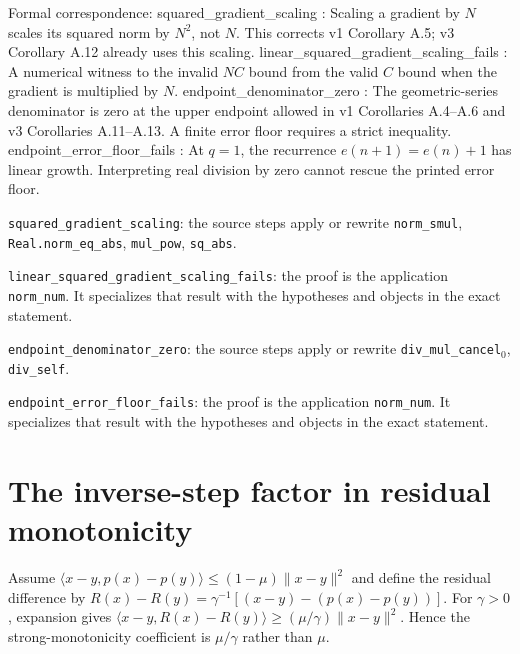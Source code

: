 \documentclass[11pt,a4paper]{article}
\begin{document}
\begin{leanbox}
Formal correspondence: squared\_gradient\_scaling : Scaling a gradient by \(N\) scales its squared norm by \(N^2\), not \(N\). This corrects v1 Corollary A.5; v3 Corollary A.12 already uses this scaling. linear\_squared\_gradient\_scaling\_fails : A numerical witness to the invalid \(NC\) bound from the valid \(C\) bound when the gradient is multiplied by \(N\). endpoint\_denominator\_zero : The geometric-series denominator is zero at the upper endpoint allowed in v1 Corollaries A.4--A.6 and v3 Corollaries A.11--A.13. A finite error floor requires a strict inequality. endpoint\_error\_floor\_fails : At \(q=1\), the recurrence \(e(n+1)=e(n)+1\) has linear growth. Interpreting real division by zero cannot rescue the printed error floor.



\texttt{squared\_\allowbreak{}gradient\_\allowbreak{}scaling}: the source steps apply or rewrite \texttt{norm\_\allowbreak{}smul}, \texttt{Real.\allowbreak{}norm\_\allowbreak{}eq\_\allowbreak{}abs}, \texttt{mul\_\allowbreak{}pow}, \texttt{sq\_\allowbreak{}abs}.



\texttt{linear\_\allowbreak{}squared\_\allowbreak{}gradient\_\allowbreak{}scaling\_\allowbreak{}fails}: the proof is the application \texttt{norm\_\allowbreak{}num}. It specializes that result with the hypotheses and objects in the exact statement.



\texttt{endpoint\_\allowbreak{}denominator\_\allowbreak{}zero}: the source steps apply or rewrite \texttt{div\_\allowbreak{}mul\_\allowbreak{}cancel\ensuremath{{}_{0}}}, \texttt{div\_\allowbreak{}self}.



\texttt{endpoint\_\allowbreak{}error\_\allowbreak{}floor\_\allowbreak{}fails}: the proof is the application \texttt{norm\_\allowbreak{}num}. It specializes that result with the hypotheses and objects in the exact statement.
\end{leanbox}

\section{\texorpdfstring{The inverse-step factor in residual monotonicity}{The inverse-step factor in residual monotonicity}}


Assume \(\langle x-y,p(x)-p(y)\rangle\le(1-\mu)\|x-y\|^2\) and define the residual difference by \(R(x)-R(y)=\gamma^{-1}[(x-y)-(p(x)-p(y))]\). For \(\gamma>0\), expansion gives \(\langle x-y,R(x)-R(y)\rangle\ge(\mu/\gamma)\|x-y\|^2\). Hence the strong-monotonicity coefficient is \(\mu/\gamma\) rather than \(\mu\).
\end{document}
